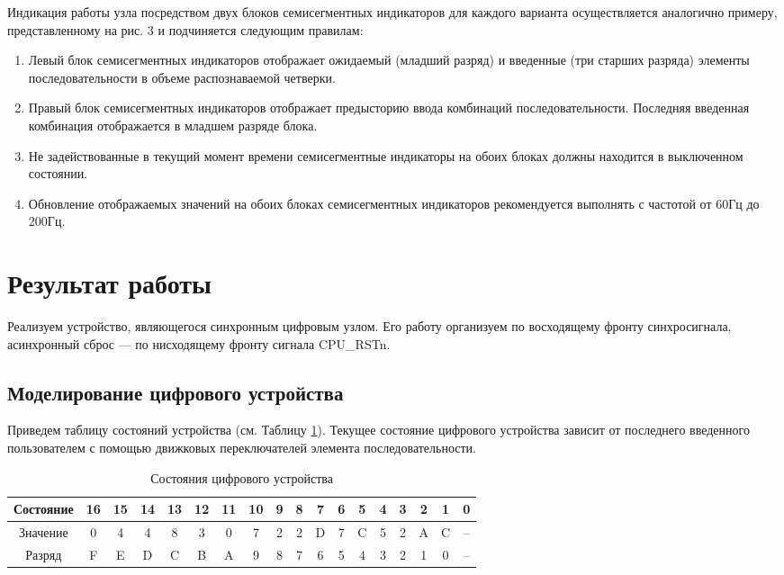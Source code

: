 \documentclass[a4paper,14pt]{extarticle}
\begin{document}
Индикация работы узла посредством двух блоков семисегментных индикаторов для
каждого варианта осуществляется аналогично примеру, представленному на рис. 3 и
подчиняется следующим правилам:
\begin{enumerate}
	\item Левый блок семисегментных индикаторов отображает ожидаемый (младший
	разряд) и введенные (три старших разряда) элементы последовательности в объеме
	распознаваемой четверки.
	\item  Правый блок семисегментных индикаторов отображает предысторию ввода
	комбинаций последовательности. Последняя введенная комбинация отображается в
	младшем разряде блока.
	\item  Не задействованные в текущий момент времени семисегментные индикаторы на
	обоих блоках должны находится в выключенном состоянии.
	\item Обновление отображаемых значений на обоих блоках семисегментных
	индикаторов рекомендуется выполнять с частотой от 60Гц до 200Гц.
\end{enumerate}


\section*{Результат работы}

Реализуем устройство, являющегося синхронным цифровым узлом. Его работу организуем по восходящему фронту синхросигнала, асинхронный сброс --- по нисходящему фронту сигнала CPU\_RSTn. 

\subsection*{Моделирование цифрового устройства}

Приведем таблицу состояний устройства (см. Таблицу \ref{tab:states}). Текущее состояние цифрового устройства зависит от последнего введенного пользователем с помощью движковых переключателей элемента последовательности. 

\begin{table}[htbp]
	\centering
	\caption{Состояния цифрового устройства}
	\begin{tabular}{|c|c|c|c|c|c|c|c|c|c|c|c|c|c|c|c|c|c|}
		\hline
		Состояние & 16& 15&	14	&13	&12&11&	10&	9&	8&	7&	6&	5&	4&	3&	2&	1&	0\\ \hline\hline
		Значение & 0 & 4 & 4 & 8 & 3 & 0 & 7 & 2 & 2 & D & 7 & C & 5 & 2 & A & C&-- \\ \hline\hline
		Разряд & F & E & D & C & B & A & 9 & 8 & 7 & 6 & 5 & 4 & 3 & 2 & 1 & 0 &--\\ \hline
	\end{tabular}

	\label{tab:states}
\end{table}
\end{document}
